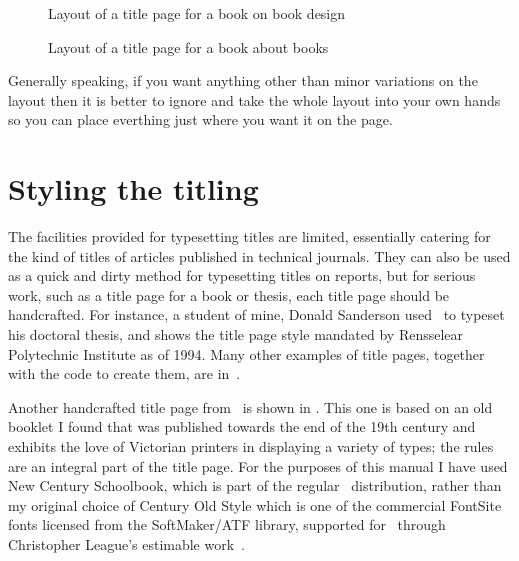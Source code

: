 \begin{figure}
\centering
\begin{showtitle}
\titleDB
\end{showtitle}
\caption{Layout of a title page for a book on book design}\label{figure:titleDB}
\end{figure}

\begin{figure}
\centering
\begin{showtitle}
\titleGM
\end{showtitle}
\caption{Layout of a title page for a book about books}\label{figure:titleGM}
\end{figure}

    Generally speaking, if you want anything other than minor variations
on the \cmd{\maketitle} layout then it is better to ignore \cmd{\maketitle}
and take the whole layout into your own hands so you can place everthing 
just where you want it on the page.

\section{Styling the titling}



   The facilities provided for typesetting titles are limited, essentially
catering for the kind of titles of articles published in technical journals.
They can also be used as a quick and dirty method for typesetting titles
on reports, but for serious work, such as a title page for a book or thesis,
each title page should be handcrafted. 
For instance, a student of mine, Donald Sanderson
used \ltx\ to typeset his doctoral thesis, and  shows 
the title page style mandated by Rensselear Polytechnic Institute as of 1994.
Many other examples of title pages, together with the code to create them,
are in~\cite{TITLEPAGES}.

    Another handcrafted title page from~\cite{TITLEPAGES} is 
shown in . This one is based on an old booklet I found 
that was 
published towards the end of the 19th century and exhibits the love of 
Victorian printers in displaying a variety of types; the rules are
an integral part of the title page. For the purposes of this manual I 
have used New Century Schoolbook, which 
is part of the regular
\ltx\ distribution, rather than my original choice of 
Century Old Style
which is one of the commercial FontSite fonts licensed from 
the 
SoftMaker/ATF library, supported for \ltx\ through 
Christopher
League's estimable work~\cite{TEXFONTSITE}.

